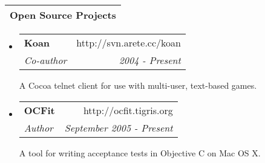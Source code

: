 \documentclass[letterpaper,11pt]{article}
\makeatletter
\newcommand{\resumesection}[1]{
  \setlength\extrarowheight{4pt}
  \begin{tabularx}{\linewidth}[h]{L}
    \hline\textbf{\Large #1}\\\hline
\end{tabularx}}
\newcommand{\resumeitemheading}[4]{
  \item
  \begin{tabular*}{6.5in}{l@{\extracolsep{\fill}}r}
    \textbf{#1} & #2 \\
    \textit{#3} & \textit{#4} \\
\end{tabular*}}
\makeatother
\begin{document}
\resumesection{Open Source Projects}
\begin{itemize}
  \resumeitemheading{Koan}
  {http://svn.arete.cc/koan}
  {Co-author}{2004 - Present}
  A Cocoa telnet client for use with multi-user, text-based games.

  \resumeitemheading{OCFit}
  {http://ocfit.tigris.org}
  {Author}{September 2005 - Present}
  A tool for writing acceptance tests in Objective C on Mac OS X.




\end{itemize}
\end{document}
